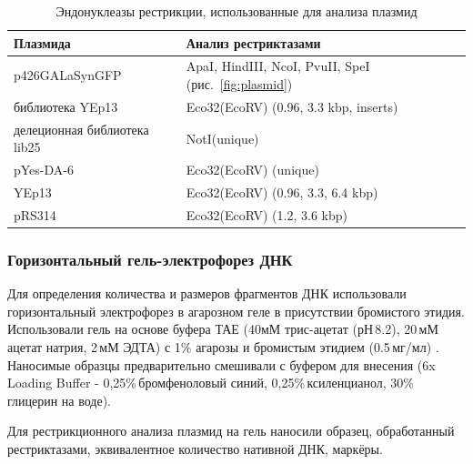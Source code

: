 \begin{table}[!h]
	\small
	\caption{Эндонуклеазы рестрикции, использованные для анализа плазмид}
	\label{table:}
	\begin{tabular}{
		p{0.4\width - \tabcolsep}
		p{0.6\width - \tabcolsep}}
	\graytable
	\toprule
	Плазмида & Анализ рестриктазами\\
	\midrule
	p426GALaSynGFP & ApaI, HindIII, NcoI, PvuII, SpeI (рис.~\ref{fig:plasmid}) \\
	библиотека YEp13 & Eco32(EcoRV) (0.96, 3.3 kbp, inserts)\\ 
	делеционная библиотека lib25 & NotI(unique) \\
	pYes-DA-6 & Eco32(EcoRV) (unique)\\
	YEp13 &  Eco32(EcoRV) (0.96, 3.3, 6.4 kbp) \\
	pRS314 & Eco32(EcoRV) (1.2, 3.6 kbp) \\

	\bottomrule
	\end{tabular}
\end{table}	

\subsubsection{Горизонтальный гель-электрофорез ДНК}
\label{subsec:gel}
Для определения количества и размеров фрагментов ДНК использовали горизонтальный электрофорез в агарозном геле в присутствии бромистого этидия. Использовали гель на основе буфера ТАЕ (40мМ трис-ацетат (рН\,8.2), 20\,мМ ацетат натрия, 2\,мМ ЭДТА) с 1\% агарозы и бромистым этидием (0.5\,мг/мл) . Наносимые образцы предварительно смешивали с буфером для внесения (6x Loading Buffer - 0,25\%\,бромфеноловый синий, 0,25\%\,ксиленцианол, 30\%\,глицерин на воде).

Для рестрикционного анализа плазмид на гель наносили образец, обработанный рестриктазами, эквивалентное количество нативной ДНК, маркёры.

